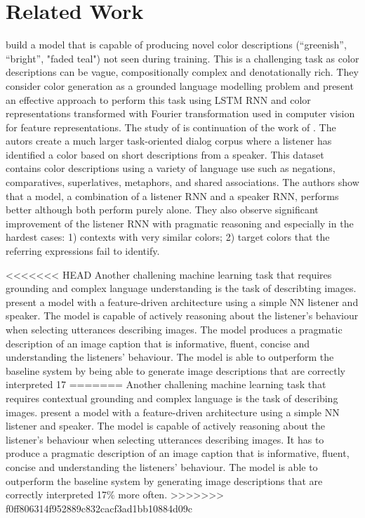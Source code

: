 \section{Related Work}

\citep{monroe-2016-compositional} build a model that is capable of producing novel color descriptions (“greenish”, “bright”, "faded teal") not seen during training. This is a challenging task as color descriptions can be vague, compositionally complex and denotationally rich. They consider color generation as a grounded language modelling problem and present an effective approach to perform this task using LSTM RNN and color representations transformed with Fourier transformation used in computer vision for feature representations. The study of \citep{monroe-2017-colors} is continuation of the work of \citep{monroe-2016-compositional}. The autors create a much larger task-oriented dialog corpus \citep{moroe-2017-colors-reference-dataset} where a listener has identified a color based on short descriptions from a speaker. This dataset contains color descriptions using a variety of language use such as negations, comparatives, superlatives, metaphors, and shared associations. The authors show that a model, a combination of a listener RNN and a speaker RNN, performs better although both perform purely alone. They also observe significant improvement of the listener RNN with pragmatic reasoning and especially in the hardest cases: 1) contexts with very similar colors; 2) target colors that the referring expressions fail to identify.

\par
<<<<<<< HEAD
Another challening machine learning task that requires grounding and complex language understanding is the task of describting images. \citep{andreas-2016-reasoning} present a model with a feature-driven architecture using a simple NN listener and speaker. The model is capable of actively reasoning about the listener’s behaviour when selecting utterances describing images. The model produces a pragmatic description of an image caption that is informative, fluent, concise and understanding the listeners’ behaviour. The model is able to outperform the baseline system by being able to generate image descriptions that are correctly interpreted 17%
=======
Another challening machine learning task that requires contextual grounding and complex language is the task of describing images. \citep{andreas-2016-reasoning} present a model with a feature-driven architecture using a simple NN listener and speaker. The model is capable of actively reasoning about the listener’s behaviour when selecting utterances describing images. It has to produce a pragmatic description of an image caption that is informative, fluent, concise and understanding the listeners’ behaviour. The model is able to outperform the baseline system by generating image descriptions that are correctly interpreted 17\% more often.
>>>>>>> f0ff806314f952889c832cacf3ad1bb10884d09c

